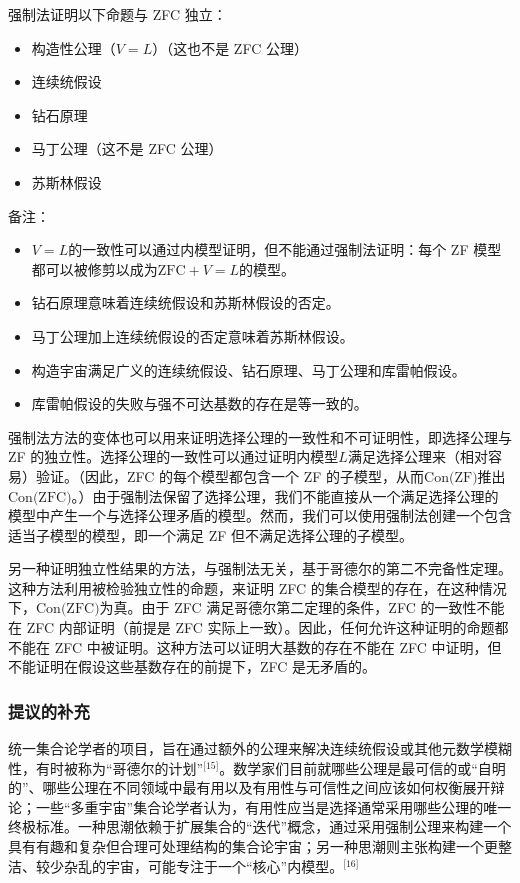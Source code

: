 强制法证明以下命题与 ZFC 独立：
\begin{itemize}
\item 构造性公理（\( V = L \)）（这也不是 ZFC 公理）
\item 连续统假设
\item 钻石原理
\item 马丁公理（这不是 ZFC 公理）
\item 苏斯林假设
\end{itemize}
备注：
\begin{itemize}
\item \( V = L \)的一致性可以通过内模型证明，但不能通过强制法证明：每个 ZF 模型都可以被修剪以成为\( \text{ZFC} + V = L \)的模型。
\item 钻石原理意味着连续统假设和苏斯林假设的否定。
\item 马丁公理加上连续统假设的否定意味着苏斯林假设。
\item 构造宇宙满足广义的连续统假设、钻石原理、马丁公理和库雷帕假设。
\item 库雷帕假设的失败与强不可达基数的存在是等一致的。
\end{itemize}
强制法方法的变体也可以用来证明选择公理的一致性和不可证明性，即选择公理与 ZF 的独立性。选择公理的一致性可以通过证明内模型\( L \)满足选择公理来（相对容易）验证。（因此，ZFC 的每个模型都包含一个 ZF 的子模型，从而\( \text{Con(ZF)} \)推出\( \text{Con(ZFC)} \)。）由于强制法保留了选择公理，我们不能直接从一个满足选择公理的模型中产生一个与选择公理矛盾的模型。然而，我们可以使用强制法创建一个包含适当子模型的模型，即一个满足 ZF 但不满足选择公理的子模型。

另一种证明独立性结果的方法，与强制法无关，基于哥德尔的第二不完备性定理。这种方法利用被检验独立性的命题，来证明 ZFC 的集合模型的存在，在这种情况下，\( \text{Con(ZFC)} \)为真。由于 ZFC 满足哥德尔第二定理的条件，ZFC 的一致性不能在 ZFC 内部证明（前提是 ZFC 实际上一致）。因此，任何允许这种证明的命题都不能在 ZFC 中被证明。这种方法可以证明大基数的存在不能在 ZFC 中证明，但不能证明在假设这些基数存在的前提下，ZFC 是无矛盾的。
\subsubsection{提议的补充}  
统一集合论学者的项目，旨在通过额外的公理来解决连续统假设或其他元数学模糊性，有时被称为“哥德尔的计划”\(^\text{[15]}\)。数学家们目前就哪些公理是最可信的或“自明的”、哪些公理在不同领域中最有用以及有用性与可信性之间应该如何权衡展开辩论；一些“多重宇宙”集合论学者认为，有用性应当是选择通常采用哪些公理的唯一终极标准。一种思潮依赖于扩展集合的“迭代”概念，通过采用强制公理来构建一个具有有趣和复杂但合理可处理结构的集合论宇宙；另一种思潮则主张构建一个更整洁、较少杂乱的宇宙，可能专注于一个“核心”内模型。\(^\text{[16]}\)
